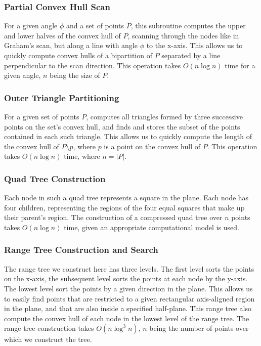 \documentclass{article}
\begin{document}
\subsubsection{Partial Convex Hull Scan}

For a given angle $\phi$ and a set of points $P$, this subroutine computes the upper and lower halves of the convex hull of $P$, scanning through the nodes like in Graham's scan, but along a line with angle $\phi$ to the x-axis. This allows us to quickly compute convex hulls of a bipartition of $P$ separated by a line perpendicular to the scan direction. This operation takes $O(n \log n)$ time for a given angle, $n$ being the size of $P$.

\subsubsection{Outer Triangle Partitioning} \label{subsub:outer_triangle_partitioning}

For a given set of points $P$, computes all triangles formed by three successive points on the set's convex hull, and finds and stores the subset of the points contained in each such triangle. This allows us to quickly compute the length of the convex hull of $P \setminus {p}$, where $p$ is a point on the convex hull of $P$. This operation takes $O(n \log n)$ time, where $n = |P|$.
    
\subsubsection{Quad Tree Construction} 

Each node in such a quad tree represents a square in the plane. Each node has four children, representing the regions of the four equal squares that make up their parent's region. The construction of a compressed quad tree over $n$ points takes $O(n \log n)$ time, given an appropriate computational model is used.

\subsubsection{Range Tree Construction and Search} \label{subsub:range_tree_construction_and_search}

The range tree we construct here has three levels. The first level sorts the points on the x-axis, the subsequent level sorts the points at each node by the y-axis. The lowest level sort the points by a given direction in the plane. This allows us to easily find points that are restricted to a given rectangular axis-aligned region in the plane, and that are also inside a specified half-plane. This range tree also compute the convex hull of each node in the lowest level of the range tree. The range tree construction takes $O(n\log^3n)$, $n$ being the number of points over which we construct the tree.
\end{document}
